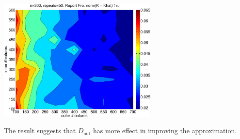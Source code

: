 \documentclass[english]{article}
\theoremstyle{plain}
\theoremstyle{plain}
\begin{document}
\begin{center}
\includegraphics[width=8cm]{img/kggauss_rf_grid-crop} 
\end{center}

The result suggests that $D_\mathrm{out}$ has more effect in improving the
approximation.
\end{document}
